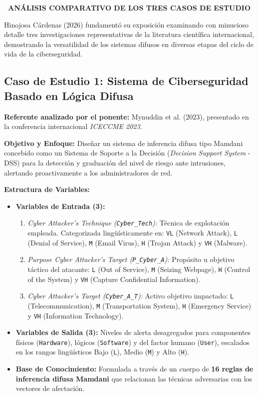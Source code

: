 \documentclass[12pt,a4paper]{article}
\newcommand{\llav}{\symbol{60}\symbol{60}}
\newcommand{\rlav}{\symbol{62}\symbol{62}}
\newcommand{\marcador}[1]{\llav\ #1\ \rlav}
\newcommand{\seccion}[1]{%
  \vspace{0.65cm}%
  {\centering\bfseries\fontsize{12pt}{14pt}\selectfont\marcador{\MakeUppercase{#1}}\par}%
  \vspace{0.30cm}%
}
\begin{document}
\seccion{ANÁLISIS COMPARATIVO DE LOS TRES CASOS DE ESTUDIO}

Hinojosa Cárdenas (2026) fundamentó su exposición examinando con minucioso detalle tres investigaciones representativas de la literatura científica internacional, demostrando la versatilidad de los sistemas difusos en diversas etapas del ciclo de vida de la ciberseguridad.

\subsection*{Caso de Estudio 1: Sistema de Ciberseguridad Basado en Lógica Difusa}
\noindent\textbf{Referente analizado por el ponente:} Mynuddin et al. (2023), presentado en la conferencia internacional \textit{ICECCME 2023}.

\textbf{Objetivo y Enfoque:} Diseñar un sistema de inferencia difusa tipo Mamdani concebido como un Sistema de Soporte a la Decisión (\textit{Decision Support System} - DSS) para la detección y graduación del nivel de riesgo ante intrusiones, alertando proactivamente a los administradores de red.

\textbf{Estructura de Variables:}
\begin{itemize}
    \item \textbf{Variables de Entrada (3):}
    \begin{enumerate}
        \item \textit{Cyber Attacker's Technique (\texttt{Cyber\_Tech}):} Técnica de explotación empleada. Categorizada lingüísticamente en: \texttt{VL} (Network Attack), \texttt{L} (Denial of Service), \texttt{M} (Email Virus), \texttt{H} (Trojan Attack) y \texttt{VH} (Malware).
        \item \textit{Purpose Cyber Attacker's Target (\texttt{P\_Cyber\_A}):} Propósito u objetivo táctico del atacante: \texttt{L} (Out of Service), \texttt{M} (Seizing Webpage), \texttt{H} (Control of the System) y \texttt{VH} (Capture Confidential Information).
        \item \textit{Cyber Attacker's Target (\texttt{Cyber\_A\_T}):} Activo objetivo impactado: \texttt{L} (Telecommunication), \texttt{M} (Transportation System), \texttt{H} (Emergency Service) y \texttt{VH} (Information Technology).
    \end{enumerate}
    \item \textbf{Variables de Salida (3):} Niveles de alerta desagregados para componentes físicos (\texttt{Hardware}), lógicos (\texttt{Software}) y del factor humano (\texttt{User}), escalados en los rangos lingüísticos Bajo (\texttt{L}), Medio (\texttt{M}) y Alto (\texttt{H}).
    \item \textbf{Base de Conocimiento:} Formulada a través de un cuerpo de \textbf{16 reglas de inferencia difusa Mamdani} que relacionan las técnicas adversarias con los vectores de afectación.
\end{itemize}
\end{document}
